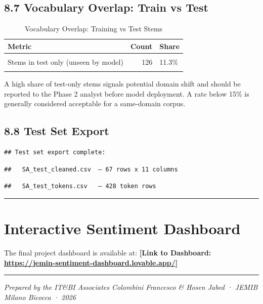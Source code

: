 \documentclass[
]{article}
\begin{document}
\subsection{8.7 Vocabulary Overlap: Train vs
Test}\label{vocabulary-overlap-train-vs-test}

\begin{longtable}[t]{lrl}
\caption{\label{tab:vocab-overlap}Vocabulary Overlap: Training vs Test Stems}\\
\toprule
Metric & Count & Share\\
\midrule
\cellcolor{gray!10}{Stems in both train \& test} & \cellcolor{gray!10}{152} & \cellcolor{gray!10}{13.7\%}\\
Stems in test only (unseen by model) & 126 & 11.3\%\\
\cellcolor{gray!10}{Stems in train only (absent from test)} & \cellcolor{gray!10}{835} & \cellcolor{gray!10}{75\%}\\
\bottomrule
\end{longtable}

A high share of test-only stems signals potential domain shift and
should be reported to the Phase 2 analyst before model deployment. A
rate below 15\% is generally considered acceptable for a same-domain
corpus.

\subsection{8.8 Test Set Export}\label{test-set-export}

\begin{verbatim}
## Test set export complete:
\end{verbatim}

\begin{verbatim}
##   SA_test_cleaned.csv  — 67 rows x 11 columns
\end{verbatim}

\begin{verbatim}
##   SA_test_tokens.csv   — 428 token rows
\end{verbatim}

\begin{center}\rule{0.5\linewidth}{0.5pt}\end{center}

\section{Interactive Sentiment
Dashboard}\label{interactive-sentiment-dashboard}

The final project dashboard is available at: \textbf{{[}Link to
Dashboard: \url{https://jemin-sentiment-dashboard.lovable.app/}{]}}

\begin{center}\rule{0.5\linewidth}{0.5pt}\end{center}

\emph{Prepared by the IT\&BI Associates Colombini Francesco \& Hosen
Jabed · JEMIB Milano Bicocca · 2026}
\end{document}
